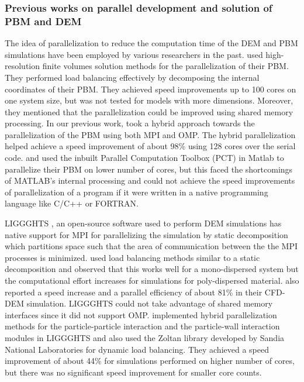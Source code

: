 \documentclass[preprint,11pt,authoryear]{elsarticle}
\begin{document}
\subsubsection{Previous works on parallel development and solution of PBM and DEM}
The idea of parallelization to reduce the computation time of the DEM and PBM simulations have 
been employed by various researchers in the past. \cite{Gunawan2008} used high-resolution 
finite volumes solution methods for the parallelization of their PBM. They performed load 
balancing effectively by decomposing the internal coordinates of their PBM. They achieved 
speed improvements up to 100 cores on one system size, but was not tested for models 
with more dimensions. Moreover, they mentioned that the parallelization could be 
improved using shared memory processing. 
In our previous work, \cite{Bettencourt2017} took a 
hybrid approach towards the parallelization of the PBM using both MPI and OMP. 
The hybrid parallelization helped achieve a speed improvement of about 98\% using 
128 cores over the serial code. 
\cite{Prakash2013a} and \cite{Prakash2013b} used the inbuilt Parallel Computation 
Toolbox (PCT) in Matlab \citep{pctMatlab} to parallelize their PBM on lower number 
of cores, but this faced the shortcomings of MATLAB's internal processing and 
could not achieve the speed improvements of parallelization of a program if 
it were written in a native programming language like C/C++ or FORTRAN. 

LIGGGHTS \citep{Kloss2012}, an open-source software used to perform DEM simulations has native 
support for MPI for parallelizing the simulation by static decomposition which partitions space such that 
the area of communication between the the MPI processes is minimized. \cite{kacianauskas2010} used 
load balancing methods similar to a static decomposition and observed that this works well for a 
mono-dispersed system but the computational effort increases for simulations for poly-dispersed 
material. \cite{Gopalakrishnan2013} also reported a speed increase and a parallel efficiency of about 
81\% in their CFD-DEM simulation. LIGGGHTS could not take advantage of shared memory interfaces 
since it did not support OMP. \cite{Berger2015} implemented hybrid parallelization methods for the 
particle-particle interaction and the particle-wall interaction modules in LIGGGHTS and also used the 
Zoltan library \citep{Boman2012} developed by Sandia National Laboratories for dynamic load 
balancing. They achieved a speed improvement of about 44\% for simulations performed on higher 
number of cores, but there was no significant speed improvement for smaller core counts. 
\end{document}
